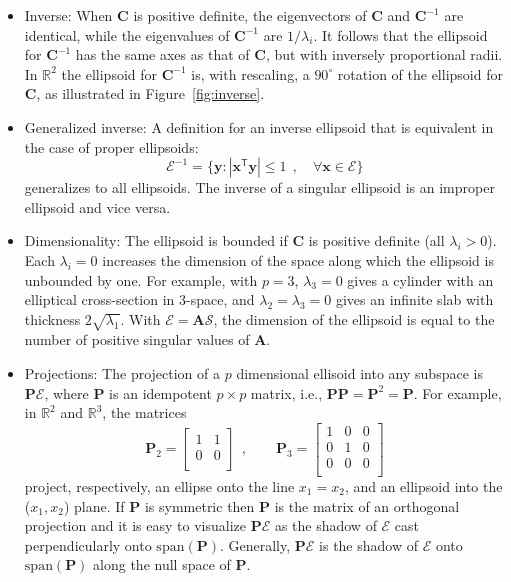 \documentclass[11pt]{article}%
\newcommand*{\figref}[1]{Figure~\ref{#1}}
\renewcommand*{\vec}[1]{\ensuremath{\bm{#1}}}
\newcommand{\trans}{\ensuremath{^\mathsf{T}}}
\newcommand*{\mat}[1]{\ensuremath{\bm{#1}}}
\newcommand*{\comma}{\:\: ,}
\newcommand*{\Real}[1]{\mathbb{R}^{#1}}
\newcommand*{\degree}[1]{\ensuremath{{#1}^{\circ}}}
\begin{document}
\begin{itemize}
 \item Inverse: When $\mat{C}$ is positive definite, the eigenvectors of \mat{C} and $\mat{C}^{-1}$ are identical, while 
the
 eigenvalues of $\mat{C}^{-1}$ are $1/\lambda_i$. It follows that the ellipsoid for
 $\mat{C}^{-1}$ has the same axes as that of $\mat{C}$, but with inversely proportional radii.
 In $\Real{2}$ the ellipsoid for $\mat{C}^{-1}$
 is, with rescaling, a \degree{90} rotation of the ellipsoid for $\mat{C}$,
 as illustrated in \figref{fig:inverse}.

 \item Generalized inverse: A definition for an inverse ellipsoid that is equivalent in the case of proper ellipsoids:
\begin{equation}\label{eq:ellipseginv}
\mathcal{E}^{-1} = \{ \vec{y} :   |\vec{x} \trans \vec{y}| \le 1 \comma \quad \forall \vec{x} \in \mathcal{E} \}
\end{equation}
generalizes to all ellipsoids. The inverse of a singular ellipsoid is an improper ellipsoid and vice versa.

 \item Dimensionality: The ellipsoid is bounded if $\mat{C}$ is positive definite (all $\lambda_i > 0$).
 Each $\lambda_i = 0$ increases the dimension of the space along which the ellipsoid is unbounded by one.  
For example, with $p=3$, $\lambda_3=0$ gives a
cylinder with an elliptical cross-section in 3-space, and  $\lambda_2 = \lambda_3=0$ gives an infinite slab with thickness $2 \sqrt{\lambda_1}$. With $\mathcal{E} = \mat{A} \mathcal{S}$, the dimension of the ellipsoid is equal to the number of positive singular values of $\mat{A}$.  
 \item Projections: The projection of a $p$ dimensional ellisoid into any subspace
is $\mat{P} \mathcal{E}$, where
$\mat{P}$ is an idempotent $p \times p$ matrix, i.e., $\mat{P} \mat{P}= \mat{P}^2 = \mat{P}$.
For example, in $\Real{2}$ and $\Real{3}$,
the matrices
\[
\mat{P}_2 =
\left[
\begin{array}{cc}
 1 & 1  \\
 0 & 0  \\
\end{array}
\right]
\comma \quad\quad 
\mat{P}_3 =
\left[
\begin{array}{ccc}
 1 & 0 & 0 \\
 0 & 1 & 0 \\
 0 & 0 & 0 \\
\end{array}
\right]
\]
project, respectively, an ellipse onto the line $x_1 = x_2$, and an ellipsoid into the ($x_1, x_2$) plane.  If $\mat{P}$ is symmetric then $\mat{P}$ is the matrix of an orthogonal projection and it is easy to visualize  $\mat{P} \mathcal{E}$ as the shadow of  $\mathcal{E}$ cast perpendicularly onto  $\mathrm{span}(\mat{P})$. Generally,  $\mat{P} \mathcal{E}$ is the shadow of $\mathcal{E}$  onto  $\mathrm{span}(\mat{P})$ along the null space of $\mat{P}$. 


\end{itemize}
\end{document}
